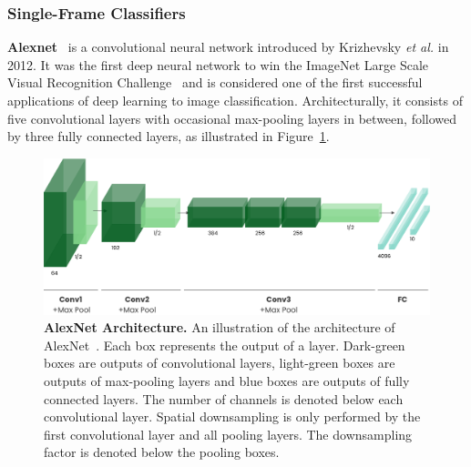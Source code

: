\documentclass[a4paper]{article}
\begin{document}
\subsubsection{Single-Frame Classifiers} %

\textbf{Alexnet}~\cite{alexnet} is a convolutional neural network introduced by
Krizhevsky \textit{et al.} in 2012. It was the first deep neural network to win
the ImageNet Large Scale Visual Recognition Challenge~\cite{imagenet} and is
considered one of the first successful applications of deep learning to image
classification. Architecturally, it consists of five convolutional layers with
occasional max-pooling layers in between, followed by three fully connected
layers, as illustrated in Figure~\ref{fig:alexnet}.

\begin{figure}
  \centering
  \includegraphics[width=\textwidth]{./figures/alexnet.png}
  \caption{\textbf{AlexNet Architecture.} An illustration of the architecture of
    AlexNet~\cite{alexnet}. Each box represents the output of a layer.
    Dark-green boxes are outputs of convolutional layers, light-green boxes are
    outputs of max-pooling layers and blue boxes are outputs of fully connected
    layers. The number of channels is denoted below each convolutional layer.
    Spatial downsampling is only performed by the first convolutional layer and
    all pooling layers. The downsampling factor is denoted below the pooling
    boxes.
  }
  \label{fig:alexnet}
\end{figure}

\end{document}
